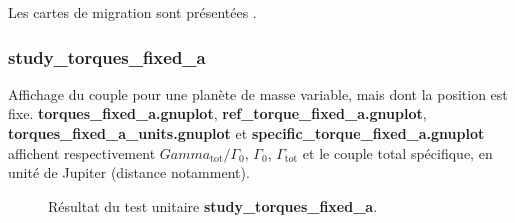 Les cartes de migration sont présentées .

\subsubsection{study\_torques\_fixed\_a}
Affichage du couple pour une planète de masse variable, mais dont la position est fixe. \textbf{torques\_fixed\_a.gnuplot}, \textbf{ref\_torque\_fixed\_a.gnuplot}, \textbf{torques\_fixed\_a\_units.gnuplot} et \textbf{specific\_torque\_fixed\_a.gnuplot} affichent respectivement $Gamma_\text{tot}/\Gamma_0$, $\Gamma_0$, $\Gamma_\text{tot}$ et le couple total spécifique, en unité de Jupiter (distance notamment). 

\begin{figure}[htbp]
\centering
{}\hfill
{}

\hfill
{}
\caption{Résultat du test unitaire \textbf{study\_torques\_fixed\_a}.}
\end{figure}

